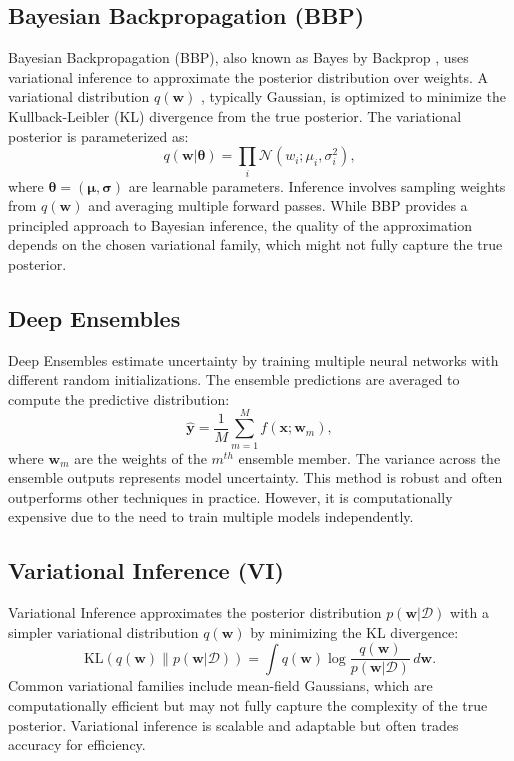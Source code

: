 \documentclass{article}
\begin{document}
\subsection{Bayesian Backpropagation (BBP)}
Bayesian Backpropagation (BBP), also known as Bayes by Backprop \cite{blundell15}, uses variational inference to approximate the posterior distribution over weights. A variational distribution  $q(\mathbf{w})$ , typically Gaussian, is optimized to minimize the Kullback-Leibler (KL) divergence from the true posterior. The variational posterior is parameterized as:
$$
q(\mathbf{w} | \boldsymbol{\theta}) = \prod_{i} \mathcal{N}(w_i; \mu_i, \sigma_i^2),
$$
where  $\boldsymbol{\theta} = (\boldsymbol{\mu}, \boldsymbol{\sigma})$  are learnable parameters. Inference involves sampling weights from  $q(\mathbf{w})$  and averaging multiple forward passes. While BBP provides a principled approach to Bayesian inference, the quality of the approximation depends on the chosen variational family, which might not fully capture the true posterior.

\subsection{Deep Ensembles}
Deep Ensembles \cite{NIPS2017} estimate uncertainty by training multiple neural networks with different random initializations. The ensemble predictions are averaged to compute the predictive distribution:
$$
\hat{\mathbf{y}} = \frac{1}{M} \sum_{m=1}^{M} f(\mathbf{x}; \mathbf{w}_m),
$$
where  $\mathbf{w}_m$  are the weights of the  $m^{th}$ ensemble member. The variance across the ensemble outputs represents model uncertainty. This method is robust and often outperforms other techniques in practice. However, it is computationally expensive due to the need to train multiple models independently.

\subsection{Variational Inference (VI)}
Variational Inference \cite{NIPS2011} approximates the posterior distribution  $p(\mathbf{w} | \mathcal{D})$  with a simpler variational distribution  $q(\mathbf{w})$  by minimizing the KL divergence:
$$
\text{KL}(q(\mathbf{w}) \| p(\mathbf{w} | \mathcal{D})) = \int q(\mathbf{w}) \log \frac{q(\mathbf{w})}{p(\mathbf{w} | \mathcal{D})} \, d\mathbf{w}.
$$
Common variational families include mean-field Gaussians, which are computationally efficient but may not fully capture the complexity of the true posterior. Variational inference is scalable and adaptable but often trades accuracy for efficiency.
\end{document}
